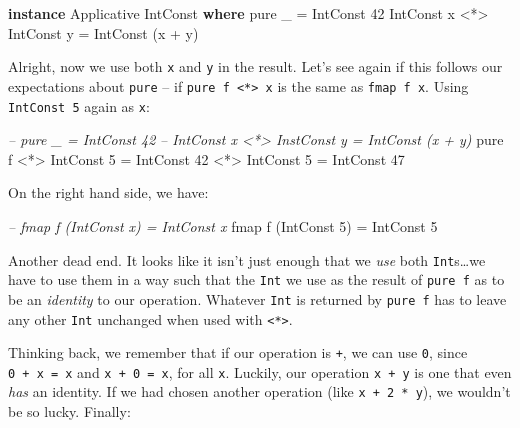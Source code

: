 \documentclass[]{article}
\newenvironment{Shaded}{}{}
\newcommand{\CommentTok}[1]{\textcolor[rgb]{0.38,0.63,0.69}{\textit{#1}}}
\newcommand{\DataTypeTok}[1]{\textcolor[rgb]{0.56,0.13,0.00}{#1}}
\newcommand{\DecValTok}[1]{\textcolor[rgb]{0.25,0.63,0.44}{#1}}
\newcommand{\FunctionTok}[1]{\textcolor[rgb]{0.02,0.16,0.49}{#1}}
\newcommand{\KeywordTok}[1]{\textcolor[rgb]{0.00,0.44,0.13}{\textbf{#1}}}
\newcommand{\NormalTok}[1]{#1}
\begin{document}
\begin{Shaded}
\begin{Highlighting}[]
\KeywordTok{instance} \DataTypeTok{Applicative} \DataTypeTok{IntConst} \KeywordTok{where}
\NormalTok{    pure _                    }\FunctionTok{=} \DataTypeTok{IntConst} \DecValTok{42}
    \DataTypeTok{IntConst}\NormalTok{ x }\FunctionTok{<*>} \DataTypeTok{IntConst}\NormalTok{ y }\FunctionTok{=} \DataTypeTok{IntConst}\NormalTok{ (x }\FunctionTok{+}\NormalTok{ y)}
\end{Highlighting}
\end{Shaded}

Alright, now we use both \texttt{x} and \texttt{y} in the result. Let's see
again if this follows our expectations about \texttt{pure} -- if
\texttt{pure\ f\ \textless{}*\textgreater{}\ x} is the same as
\texttt{fmap\ f\ x}. Using \texttt{IntConst\ 5} again as \texttt{x}:

\begin{Shaded}
\begin{Highlighting}[]
\CommentTok{-- pure _                     = IntConst 42}
\CommentTok{-- IntConst x <*> InstConst y = IntConst (x + y)}
\NormalTok{pure f }\FunctionTok{<*>} \DataTypeTok{IntConst} \DecValTok{5} \FunctionTok{=} \DataTypeTok{IntConst} \DecValTok{42} \FunctionTok{<*>} \DataTypeTok{IntConst} \DecValTok{5}
                      \FunctionTok{=} \DataTypeTok{IntConst} \DecValTok{47}
\end{Highlighting}
\end{Shaded}

On the right hand side, we have:

\begin{Shaded}
\begin{Highlighting}[]
\CommentTok{-- fmap f (IntConst x) = IntConst x}
\NormalTok{fmap f (}\DataTypeTok{IntConst} \DecValTok{5}\NormalTok{) }\FunctionTok{=} \DataTypeTok{IntConst} \DecValTok{5}
\end{Highlighting}
\end{Shaded}

Another dead end. It looks like it isn't just enough that we \emph{use} both
\texttt{Int}s\ldots{}we have to use them in a way such that the \texttt{Int} we
use as the result of \texttt{pure\ f} as to be an \emph{identity} to our
operation. Whatever \texttt{Int} is returned by \texttt{pure\ f} has to leave
any other \texttt{Int} unchanged when used with
\texttt{\textless{}*\textgreater{}}.

Thinking back, we remember that if our operation is \texttt{+}, we can use
\texttt{0}, since \texttt{0\ +\ x\ =\ x} and \texttt{x\ +\ 0\ =\ x}, for all
\texttt{x}. Luckily, our operation \texttt{x\ +\ y} is one that even \emph{has}
an identity. If we had chosen another operation (like \texttt{x\ +\ 2\ *\ y}),
we wouldn't be so lucky. Finally:
\end{document}
